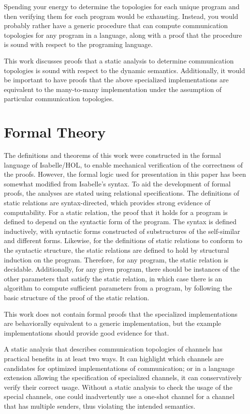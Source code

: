 \documentclass[10pt]{article}
\begin{document}
Spending your energy to determine the topologies for each unique program and then verifying
them for each program would be exhausting. Instead, you would probably rather have a generic
procedure that can compute communication topologies for any program in a language, along with
a proof that the procedure is sound with respect to the programing language.

This work discusses proofs that a static analysis to determine communication topologies is
sound with respect to the dynamic semantics.
Additionally, it would be important to have proofs that the above specialized
implementations are equivalent to the many-to-many implementation under the assumption of
particular communication topologies.

\section{Formal Theory}

The definitions and theorems of this work were constructed in the formal
language of Isabelle/HOL,
to enable mechanical verification of the correctness of the proofs.
However, the formal logic used
for presentation in this paper has been somewhat modified from Isabelle's syntax. 
To aid the development of formal proofs,
the analyses are stated using relational specifications.
The definitions of static relations are syntax-directed, which provides
strong evidence of computability.
For a static relation, the proof that it holds for a program is defined
to depend on the syntactic form of the program.
The syntax is defined inductively, with syntactic forms constructed of 
substructures of the self-similar and different forms.   
Likewise, for the definitions of static relations to conform to the
syntactic structure, the static relations are defined to hold
by structural induction on the program.
Therefore, for any program, the static relation is decidable.
Additionally, for any given program, there should be instances of the other
parameters that satisfy the static relation, in which case there is an
algorithm to compute sufficient parameters from a program,
by following the basic structure of the proof of the static relation.

This work does not contain formal proofs that the specialized implementations are
behaviorally equivalent to a generic implementation, but the example implementations
should provide good evidence for that.

A static analysis that describes communication
topologies of channels has practical benefits in at least two ways.  It can highlight which
channels are candidates for optimized implementations of communication; or in a language
extension allowing the specification of specialized channels, it can conservatively verify
their correct usage. Without a static analysis to check the usage of the special channels, one
could inadvertently use a one-shot channel for a channel that has multiple senders, thus
violating the intended semantics. 
\end{document}
